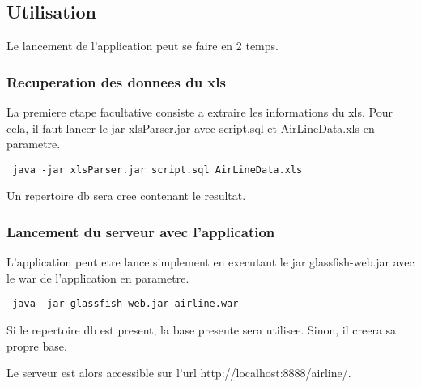 \subsection{Utilisation}
Le lancement de l'application peut se faire en 2 temps.
\subsubsection{Recuperation des donnees du xls}
La premiere etape facultative consiste a extraire les informations du xls. Pour cela, il faut lancer le jar xlsParser.jar avec script.sql et AirLineData.xls en parametre. 
\begin{verbatim}
 java -jar xlsParser.jar script.sql AirLineData.xls
\end{verbatim}
Un repertoire db sera cree contenant le resultat.
\subsubsection{Lancement du serveur avec l'application}
L'application peut etre lance simplement en executant le jar glassfish-web.jar avec le war de l'application en parametre. 
\begin{verbatim}
 java -jar glassfish-web.jar airline.war
\end{verbatim}
Si le repertoire db est present, la base presente sera utilisee. Sinon, il creera sa propre base.

Le serveur est alors accessible sur l'url http://localhost:8888/airline/. 